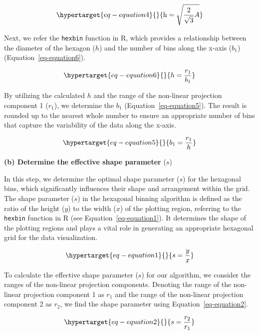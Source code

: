\documentclass[
  12pt]{article}
\begin{document}
\begin{equation}\protect\hypertarget{eq-equation4}{}{
  \text{h} = \sqrt{\frac{2}{\sqrt{3}}A}
}\label{eq-equation4}\end{equation}

Next, we refer the \texttt{hexbin} function in R, which provides a
relationship between the diameter of the hexagon (\(h\)) and the number
of bins along the x-axis (\(b_1\)) (Equation~\ref{eq-equation6}).

\begin{equation}\protect\hypertarget{eq-equation6}{}{
h = \frac{r_1}{b_1}
}\label{eq-equation6}\end{equation}

By utilizing the calculated \(h\) and the range of the non-linear
projection component 1 (\(r_1\)), we determine the \(b_1\)
(Equation~\ref{eq-equation5}). The result is rounded up to the nearest
whole number to ensure an appropriate number of bins that capture the
variability of the data along the x-axis.

\begin{equation}\protect\hypertarget{eq-equation5}{}{
b_1 = \frac{r_1}{h}
}\label{eq-equation5}\end{equation}

\textbf{(b) Determine the effective shape parameter} (\(s\))

In this step, we determine the optimal shape parameter (\(s\)) for the
hexagonal bins, which significantly influences their shape and
arrangement within the grid. The shape parameter (\(s\)) in the
hexagonal binning algorithm is defined as the ratio of the height
(\(y\)) to the width (\(x\)) of the plotting region, referring to the
\texttt{hexbin} function in R (see Equation~\ref{eq-equation1}). It
determines the shape of the plotting regions and plays a vital role in
generating an appropriate hexagonal grid for the data visualization.

\begin{equation}\protect\hypertarget{eq-equation1}{}{
s = \frac{y}{x}
}\label{eq-equation1}\end{equation}

To calculate the effective shape parameter (\(s\)) for our algorithm, we
consider the ranges of the non-linear projection components. Denoting
the range of the non-linear projection component 1 as \(r_1\) and the
range of the non-linear projection component 2 as \(r_2\), we find the
shape parameter using Equation~\ref{eq-equation2}.

\begin{equation}\protect\hypertarget{eq-equation2}{}{
s = \frac{r_2}{r_1}
}\label{eq-equation2}\end{equation}
\end{document}
